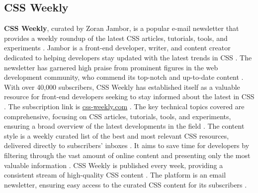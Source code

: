 \documentclass[11pt]{article}
\begin{document}
\subsection{CSS Weekly}
\textbf{CSS Weekly}, curated by Zoran Jambor, is a popular e-mail newsletter that provides a weekly roundup of the latest CSS articles, tutorials, tools, and experiments \citep{runcloud2025worlds}. Jambor is a front-end developer, writer, and content creator dedicated to helping developers stay updated with the latest trends in CSS \citep{jambor2025zoransite}. The newsletter has garnered high praise from prominent figures in the web development community, who commend its top-notch and up-to-date content \citep{cssweekly2025site}. With over 40,000 subscribers, CSS Weekly has established itself as a valuable resource for front-end developers seeking to stay informed about the latest in CSS \citep{ctoclub2025prognews}. The subscription link is \url{css-weekly.com} \citep{runcloud2025worlds}. The key technical topics covered are comprehensive, focusing on CSS articles, tutorials, tools, and experiments, ensuring a broad overview of the latest developments in the field \citep{runcloud2025worlds}. The content style is a weekly curated list of the best and most relevant CSS resources, delivered directly to subscribers' inboxes \citep{runcloud2025worlds}. It aims to save time for developers by filtering through the vast amount of online content and presenting only the most valuable information \citep{cssweekly2025site}. CSS Weekly is published every week, providing a consistent stream of high-quality CSS content \citep{runcloud2025worlds}. The platform is an email newsletter, ensuring easy access to the curated CSS content for its subscribers \citep{cssweekly2025site}.
\end{document}
